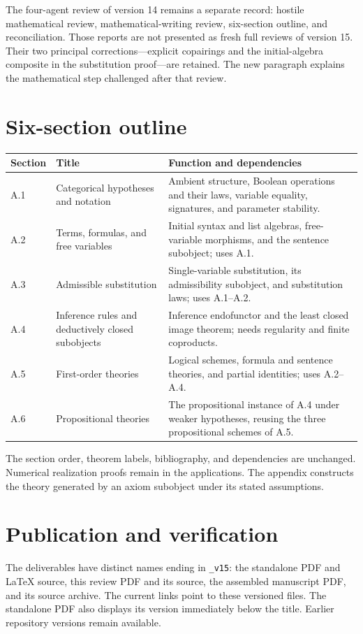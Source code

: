 \documentclass[10pt]{article}
\begin{document}
The four-agent review of version 14 remains a separate record: hostile
mathematical review, mathematical-writing review, six-section outline, and
reconciliation. Those reports are not presented as fresh full reviews of
version 15. Their two principal corrections---explicit copairings and the
initial-algebra composite in the substitution proof---are retained.
The new paragraph explains the mathematical step challenged after that review.

\newpage
\section*{Six-section outline}
\renewcommand{\arraystretch}{1.15}
\begin{tabularx}{\textwidth}{@{}p{}>{\raggedright\arraybackslash}p{}Y@{}}
\toprule
Section & Title & Function and dependencies\\\midrule
A.1 & Categorical hypotheses and notation & Ambient structure, Boolean
operations and their laws, variable equality, signatures, and parameter stability.\\
A.2 & Terms, formulas, and free variables & Initial syntax and list algebras,
free-variable morphisms, and the sentence subobject; uses A.1.\\
A.3 & Admissible substitution & Single-variable substitution, its admissibility
subobject, and substitution laws; uses A.1--A.2.\\
A.4 & Inference rules and deductively closed subobjects & Inference endofunctor
and the least closed image theorem; needs regularity and finite coproducts.\\
A.5 & First-order theories & Logical schemes, formula and sentence theories,
and partial identities; uses A.2--A.4.\\
A.6 & Propositional theories & The propositional instance of A.4 under weaker
hypotheses, reusing the three propositional schemes of A.5.\\\bottomrule
\end{tabularx}

The section order, theorem labels, bibliography, and dependencies are unchanged.
Numerical realization proofs remain in the applications. The appendix constructs
the theory generated by an axiom subobject under its stated assumptions.

\section*{Publication and verification}
The deliverables have distinct names ending in \texttt{\_v15}: the standalone
PDF and LaTeX source, this review PDF and its source, the assembled manuscript
PDF, and its source archive. The current links point to these versioned files.
The standalone PDF also displays its version immediately below the title.
Earlier repository versions remain available.
\end{document}
